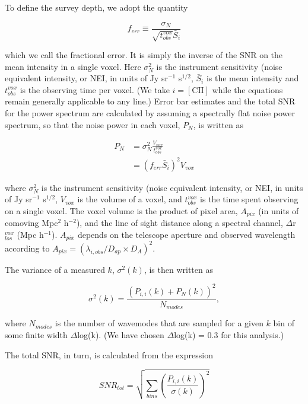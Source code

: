 \documentclass[iop]{emulateapj}
\begin{document}
To define the survey depth, we adopt the quantity 

\begin{equation}
f_{err} \equiv \frac{\sigma_N}{\sqrt{t_{obs}^{vox}} \bar{S}_i}
\label{eq:ferr}
\end{equation}

which we call the fractional error. It is simply the inverse of the SNR on the mean intensity in a single voxel. Here $\sigma_N^2$ is the instrument sensitivity (noise equivalent intensity, or NEI, in units of Jy sr$^{-1}$ s$^{1/2}$, $\bar{S}_i$ is the mean intensity and $t_{obs}^{vox}$ is the observing time per voxel. (We take $i=\mathrm{[CII]}$ while the equations remain generally applicable to any line.) Error bar estimates and the total SNR for the power spectrum are calculated by assuming a spectrally flat noise power spectrum, so that the noise power in each voxel, $P_{N}$, is written as

\begin{align}
P_N & = \sigma_N^2 \frac{V_{vox}}{t_{obs}^{vox}} \\
& = \left(f_{err} \bar{S}_i \right)^2 V_{vox} \nonumber
\end{align}

where $\sigma_N^2$ is the instrument sensitivity (noise equivalent intensity, or NEI, in units of Jy sr$^{-1}$ s$^{1/2}$, $V_{vox}$ is the volume of a voxel, and $t_{obs}^{vox}$ is the time spent observing on a single voxel. The voxel volume is the product of pixel area, $A_{pix}$ (in units of comoving Mpc$^2$ h$^{-2}$), and the line of sight distance along a spectral channel, $\Delta$r$_{los}^{vox}$ (Mpc h$^{-1}$). $A_{pix}$ depends on the telescope aperture and observed wavelength according to $A_{pix} = (\lambda_{i,obs}/D_{ap}\times D_{A})^2$.

The variance of a measured $k$, $\sigma^2(k)$, is then written as

\begin{equation}
\sigma^2(k) = \frac{\left({P_{i,i}(k) + P_N(k)}\right)^{2}}{N_{modes}},
\end{equation}

where $N_{modes}$ is the number of wavemodes that are sampled for a given $k$ bin of some finite width $\Delta$log(k). (We have chosen $\Delta$log(k) = 0.3 for this analysis.)

The total SNR, in turn, is calculated from the expression 

\begin{equation}
SNR_{tot} = \sqrt{\sum_{bins} \left(\frac{P_{i,i}(k)}{\sigma(k)}\right)^2}
\end{equation}
\end{document}
